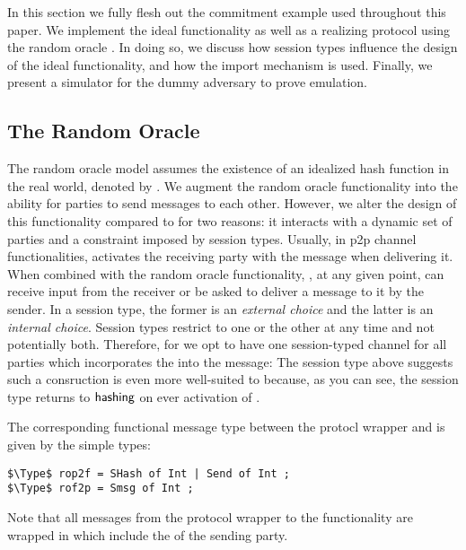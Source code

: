 In this section we fully flesh out the commitment example used throughout this paper.
We implement the ideal functionality \Fcom as well as a realizing protocol  using the random oracle \Fro.
In doing so, we discuss how session types influence the design of the ideal functionality, and how the import mechanism is used. 
Finally, we present a simulator for the dummy adversary to prove emulation.

\subsection{The Random Oracle}
The random oracle model assumes the existence of an idealized hash function in the real world, denoted by \Fro.
We augment the random oracle functionality into \Fropp the ability for parties to send messages to each other. 
However, we alter the design of this functionality compared to \Fcom for two reasons: it interacts with a dynamic set of parties and a constraint imposed by session types.
Usually, in p2p channel functionalities, \F activates the receiving party with the message when delivering it.
When combined with the random oracle functionality, \Fropp, at any given point, can receive input from the receiver or be asked to deliver a message to it by the sender. 
In a session type, the former is an \emph{external choice} and the latter is an \emph{internal choice}. 
Session types restrict to one or the other at any time and not potentially both. 
Therefore, for \Fropp we opt to have one session-typed channel for all parties which incorporates the  into the message:
The session type above suggests such a consruction is even more well-suited to \Fropp because, as you can see, the session type returns to $\mathsf{hashing}$ on ever activation of \Fropp.

The corresponding functional message type between the protocl wrapper and \Fropp is given by the simple types:
\begin{lstlisting}[basicstyle=\small\BeraMonottFamily, mathescape]
$\Type$ rop2f = SHash of Int | Send of Int ;
$\Type$ rof2p = Smsg of Int ;
\end{lstlisting}
Note that all messages from the protocol wrapper to the functionality are wrapped in  which include the  of the sending party.


